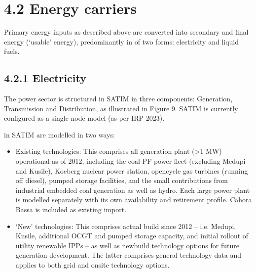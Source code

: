 \documentclass[letterpaper,10pt,english]{jupyterBook}
\begin{document}
\section{4.2 Energy carriers}
\label{\detokenize{04EnergySupply:energy-carriers}}
\sphinxAtStartPar
Primary energy inputs as described above are converted into secondary and final energy (‘usable’ energy), predominantly in of two forms: electricity and liquid fuels.


\subsection{4.2.1 Electricity}
\label{\detokenize{04EnergySupply:electricity}}
\sphinxAtStartPar
The power sector is structured in SATIM in three components: Generation, Transmission and Distribution, as illustrated in Figure 9. SATIM is currently configured as a single node model (as per IRP 2023).

\sphinxAtStartPar
{}

\sphinxAtStartPar
{} in SATIM are modelled in two ways:
\begin{itemize}
\item {} 
\sphinxAtStartPar
Existing technologies: This comprises all generation plant (>1 MW) operational as of 2012, including the coal PF power fleet (excluding Medupi and Kusile), Koeberg nuclear power station, open\sphinxhyphen{}cycle gas turbines (running off diesel), pumped storage facilities, and the small contributions from industrial embedded coal generation as well as hydro. Each large power plant is modelled separately with its own availability and retirement profile. Cahora Bassa is included as existing import.

\item {} 
\sphinxAtStartPar
‘New’ technologies: This comprises actual build since 2012 – i.e. Medupi, Kusile, additional OCGT and pumped storage capacity, and initial rollout of utility renewable IPPs – as well as new\sphinxhyphen{}build technology options for future generation development. The latter comprises general technology data and applies to both grid and on\sphinxhyphen{}site technology options.

\end{itemize}
\end{document}
